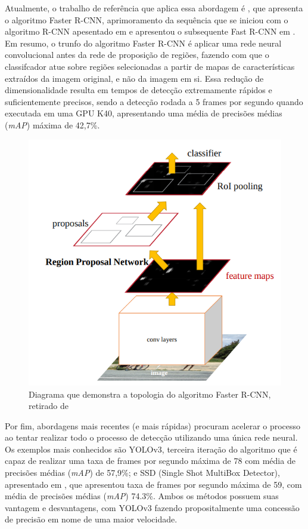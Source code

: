 \documentclass[]{politex}
\begin{document}
Atualmente, o trabalho de referência que aplica essa abordagem é \citeyear{fasterrcnn} \citeauthor{fasterrcnn}, que apresenta o algoritmo Faster R-CNN, aprimoramento da sequência que se iniciou com o algoritmo R-CNN apesentado em \citeyear{rcnn} \citeauthor{rcnn} e apresentou o subsequente Fast R-CNN em \citeyear{fastrcnn} \citeauthor{fastrcnn}. Em resumo, o trunfo do algoritmo Faster R-CNN é aplicar uma rede neural convolucional antes da rede de proposição de regiões, fazendo com que o classifcador atue sobre regiões selecionadas a partir de mapas de características extraídos da imagem original, e não da imagem em si. Essa redução de dimensionalidade resulta em tempos de detecção extremamente rápidos e suficientemente precisos, sendo a detecção rodada a 5 frames por segundo quando executada em uma GPU K40, apresentando uma média de precisões médias (\textit{mAP}) máxima de 42,7\%.

\begin{figure}[ht]
  \centering
  \includegraphics[scale=0.4]{img/fasterrcnn.png}
  \caption{Diagrama que demonstra a topologia do algoritmo Faster R-CNN, retirado de \citeyear{fasterrcnn} \citeauthor{fasterrcnn}}
  \label{fig:fasterrcnn}
\end{figure}

Por fim, abordagens mais recentes (e mais rápidas) procuram acelerar o processo ao tentar realizar todo o processo de detecção utilizando uma única rede neural. Os exemplos mais conhecidos são YOLOv3\cite{yolov3}, terceira iteração do algoritmo que é capaz de realizar uma taxa de frames por segundo máxima de 78 com média de precisões médias (\textit{mAP}) de 57,9\%; e SSD (Single Shot MultiBox Detector), apresentado em \citeyear{ssd} \citeauthor{ssd}, que apresentou taxa de frames por segundo máxima de 59, com média de precisões médias (\textit{mAP}) 74.3\%. Ambos os métodos possuem suas vantagem e desvantagens, com YOLOv3 fazendo propositalmente uma concessão de precisão em nome de uma maior velocidade.
\end{document}
